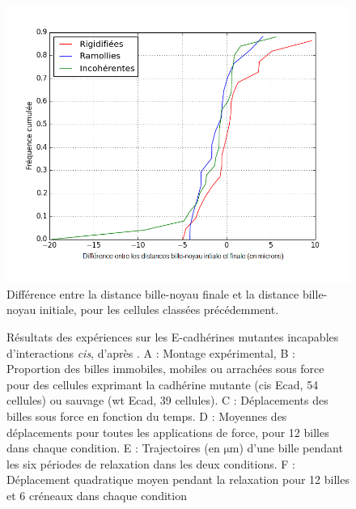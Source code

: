 \documentclass                                                                                                                                                                                                                                                                                                                                       {report}
\newcommand{\micro}{$\mathrm{\mu}$}
\begin{document}
\begin{figure}[p]
\includegraphics[scale=0.45]{Figures/Evolution_DBN.png}
\caption{Différence entre la distance bille-noyau finale et la distance bille-noyau initiale, pour les cellules classées précédemment. \label{DBN}}
\end{figure}

 \begin{figure}[p]
\caption{\small Résultats des expériences sur les E-cadhérines mutantes incapables d'interactions \textit{cis}, d'après \cite{Strale}. A : Montage expérimental, B : Proportion des billes immobiles, mobiles ou arrachées sous force pour des cellules exprimant la cadhérine mutante (cis Ecad, 54 cellules) ou sauvage (wt Ecad, 39 cellules). C : Déplacements des billes sous force en fonction du temps. D : Moyennes des déplacements pour toutes les applications de force, pour 12 billes dans chaque condition. E : Trajectoires (en \micro m) d'une bille pendant les six périodes de relaxation dans les deux conditions. F : Déplacement quadratique moyen pendant la relaxation pour 12 billes et 6 créneaux dans chaque condition}
\end{figure} 
     
\end{document}

